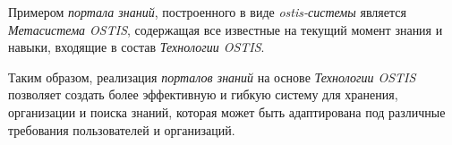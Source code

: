 Примером \textit{портала знаний}, построенного в виде \textit{ostis-системы} является \textit{Метасистема OSTIS}, содержащая все известные на текущий момент знания и навыки, входящие в состав \textit{Технологии OSTIS}.

Таким образом, реализация \textit{порталов знаний} на основе \textit{Технологии OSTIS} позволяет создать более эффективную и гибкую систему для хранения, организации и поиска знаний, которая может быть адаптирована под различные требования пользователей и организаций.
